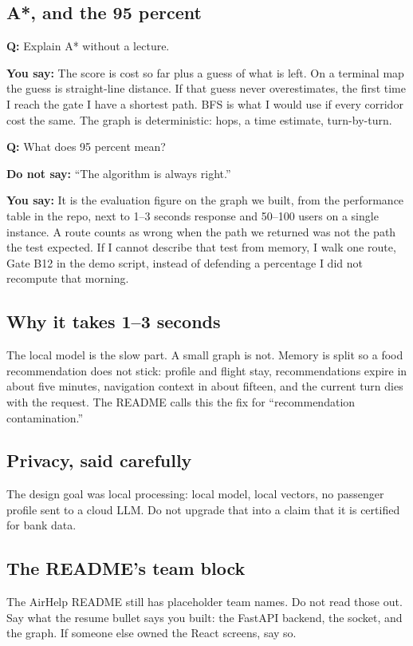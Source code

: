 \documentclass[a4paper,9.5pt]{extarticle}
\newcommand{\Q}[1]{\par\vspace{1.2pt}\noindent\textcolor{hot}{\textbf{Q:} #1}\par}
\newcommand{\Say}[1]{\noindent\textcolor{ok}{\textbf{You say:} #1}\par}
\newcommand{\No}[1]{\noindent\textcolor{muted}{\textbf{Do not say:} #1}\par}
\begin{document}
\subsection{A*, and the 95 percent}
\Q{Explain A* without a lecture.}
\Say{The score is cost so far plus a guess of what is left. On a terminal map the guess is straight-line distance. If that guess never overestimates, the first time I reach the gate I have a shortest path. BFS is what I would use if every corridor cost the same. The graph is deterministic: hops, a time estimate, turn-by-turn.}

\Q{What does 95 percent mean?}
\No{``The algorithm is always right.''}
\Say{It is the evaluation figure on the graph we built, from the performance table in the repo, next to 1--3 seconds response and 50--100 users on a single instance. A route counts as wrong when the path we returned was not the path the test expected. If I cannot describe that test from memory, I walk one route, Gate B12 in the demo script, instead of defending a percentage I did not recompute that morning.}

\subsection{Why it takes 1--3 seconds}
The local model is the slow part. A small graph is not. Memory is split so a food recommendation does not stick: profile and flight stay, recommendations expire in about five minutes, navigation context in about fifteen, and the current turn dies with the request. The README calls this the fix for ``recommendation contamination.''

\subsection{Privacy, said carefully}
The design goal was local processing: local model, local vectors, no passenger profile sent to a cloud LLM. Do not upgrade that into a claim that it is certified for bank data.

\subsection{The README's team block}
The AirHelp README still has placeholder team names. Do not read those out. Say what the resume bullet says you built: the FastAPI backend, the socket, and the graph. If someone else owned the React screens, say so.
\end{document}
